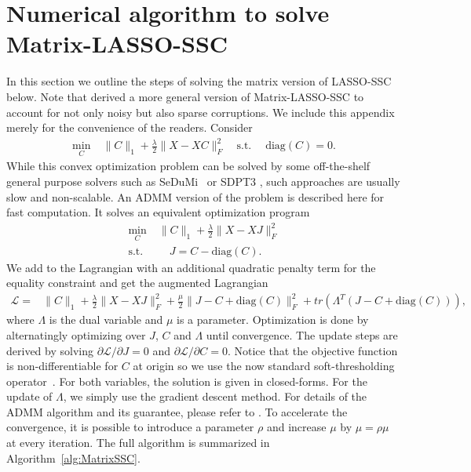 \documentclass[twoside,11pt]{article}
\numberwithin{equation}{section}
\begin{document}
\section{Numerical algorithm to solve Matrix-LASSO-SSC}\label{sec:ADMM_matrix-LASSO-SSC}
In this section we outline the steps of solving the matrix version of LASSO-SSC below. Note that \citet{elhamifar2012arxiv} derived a more general version of Matrix-LASSO-SSC  to account for not only noisy but also sparse corruptions. We include this appendix merely for the convenience of the readers. Consider
\begin{equation}\label{eq:MatrixLasso}
\begin{aligned}
\min_{C} \; &\|C\|_1+\frac{\lambda}{2}\|X-XC\|_F^2 \quad
\text{s.t.} \;\quad\mathrm{diag}(C)=0.
\end{aligned}
\end{equation}
While this convex optimization problem can be solved by some off-the-shelf general purpose solvers such as SeDuMi~\citep{sturm1999sedumi} or SDPT3 \citep{toh1999sdpt3}, such approaches are usually slow and non-scalable. An ADMM \citep{boyd2011admm} version of the problem is described here for fast computation. It solves an equivalent optimization program
\begin{equation}\label{eq:MatrixLasso_modify}
\begin{aligned}
\min_{C} \; &\|C\|_1+\frac{\lambda}{2}\|X-XJ\|_F^2 \\
\text{s.t.} \;&\quad J=C-\mathrm{diag}(C).
\end{aligned}
\end{equation}
We add to the Lagrangian with an additional quadratic penalty term for the equality constraint and get the augmented Lagrangian
\begin{align*}
\mathcal{L}=& \|C\|_1+\frac{\lambda}{2}\|X-XJ\|_F^2 + \frac{\mu}{2}\|J-C+\mathrm{diag}(C)\|_F^2
+tr(\Lambda^T(J-C+\mathrm{diag}(C))),
\end{align*}
where $\Lambda$ is the dual variable and $\mu$ is a parameter. Optimization is done by alternatingly optimizing over $J$, $C$ and $\Lambda$ until convergence. The update steps are derived by solving $\partial \mathcal{L}/\partial J=0$ and $\partial \mathcal{L}/\partial C=0$. Notice that the objective function is non-differentiable for $C$ at origin so we use the now standard soft-thresholding operator~\citep{donoho1995noising}. For both variables, the solution is given in closed-forms. For the update of $\Lambda$, we simply use the gradient descent method. For details of the ADMM algorithm and its guarantee, please refer to \citet{boyd2011admm}. To accelerate the convergence, it is possible to introduce a parameter $\rho$ and increase $\mu$ by $\mu=\rho\mu$ at every iteration. The full algorithm is summarized in Algorithm~\ref{alg:MatrixSSC}.
\end{document}
